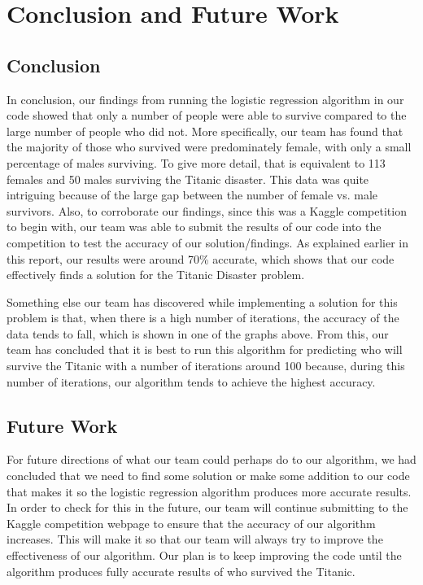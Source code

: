 \documentclass{IEEE}
\begin{document}
\section{Conclusion and Future Work}

\subsection{Conclusion}
In conclusion, our findings from running the logistic regression algorithm in our code showed that only a number of people were able to survive compared to the large number of people who did not. More specifically, our team has found that the majority of those who survived were predominately female, with only a small percentage of males surviving. To give more detail, that is equivalent to 113 females and 50 males surviving the Titanic disaster.  This data was quite intriguing because of the large gap between the number of female vs. male survivors. Also, to corroborate our findings, since this was a Kaggle competition to begin with, our team was able to submit the results of our code into the competition to test the accuracy of our solution/findings. As explained earlier in this report, our results were around 70\% accurate, which shows that our code effectively finds a solution for the Titanic Disaster problem.

Something else our team has discovered while implementing a solution for this problem is that, when there is a high number of iterations, the accuracy of the data tends to fall, which is shown in one of the graphs above. From this, our team has concluded that it is best to run this algorithm for predicting who will survive the Titanic with a number of iterations around 100 because, during this number of iterations, our algorithm tends to achieve the highest accuracy.
\subsection{Future Work}
For future directions of what our team could perhaps do to our algorithm, we had concluded that we need to find some solution or make some addition to our code that makes it so the logistic regression algorithm produces more accurate results. In order to check for this in the future, our team will continue submitting to the Kaggle competition webpage to ensure that the accuracy of our algorithm increases. This will make it so that our team will always try to improve the effectiveness of our algorithm. Our plan is to keep improving the code until the algorithm produces fully accurate results of who survived the Titanic.
\end{document}
